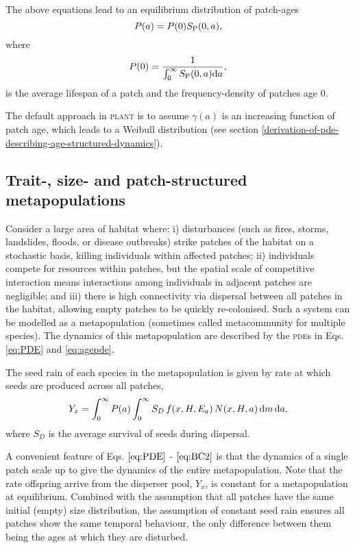 \documentclass[10pt,twoside]{article}
\newcommand{\plant}{\textsc{plant}}
\begin{document}
The above equations lead to an equilibrium distribution of patch-ages
\begin{equation} P(a) = P(0) S_{\rm P} (0, a),
\end{equation}
where
\begin{equation}
  P(0) = \frac1{\int_0^\infty S_{\rm P} (0, a) {\rm d}a},
\end{equation}
is the average lifespan of a patch and the frequency-density of patches
age \(0\).

The default approach in {\plant} is to assume  $\gamma(a)$ is an
increasing function of patch age, which leads to a Weibull distribution
(see section \ref{derivation-of-pde-describing-age-structured-dynamics}).

\subsection{Trait-, size- and patch-structured
metapopulations}\label{trait--size--and-patch-structured-metapopulations}

Consider a large area of habitat where: i) disturbances (such as fires,
storms, landslides, floods, or disease outbreaks) strike patches of the
habitat on a stochastic basis, killing individuals within affected
patches; ii) individuals compete for resources within patches, but the
spatial scale of competitive interaction means interactions among
individuals in adjacent patches are negligible; and iii) there is high
connectivity via dispersal between all patches in the habitat, allowing
empty patches to be quickly re-colonised. Such a system can be modelled
as a metapopulation (sometimes called metacommunity for multiple
species). The dynamics of this metapopulation are described by the
\textsc{pde}s in Eqs. \ref{eq:PDE} and  \ref{eq:agepde}.

The seed rain of each species in the metapopulation is given by rate at
which seeds are produced across all patches,
\begin{equation}  \label{eq:seed_rain}
  Y_x = \int_0^{\infty} P(a)  \int_0^{\infty} S_D \, f(x, H, E_a) \, N(x, H, a) \, {\rm d} m \, {\rm d} a,
\end{equation}
where \(S_D\) is the average survival of seeds during dispersal.

A convenient feature of Eqs. \(\ref{eq:PDE}\) - \(\ref{eq:BC2}\) is that
the dynamics of a single patch scale up to give the dynamics of the
entire metapopulation. Note that the rate offspring arrive from the
disperser pool, \(Y_x\), is constant for a metapopulation at
equilibrium. Combined with the assumption that all patches have the same
initial (empty) size distribution, the assumption of constant seed rain
ensures all patches show the same temporal behaviour, the only
difference between them being the ages at which they are disturbed.
\end{document}

